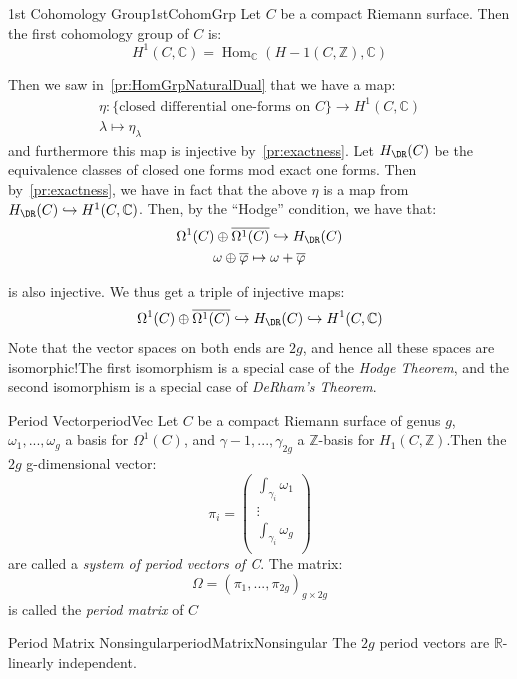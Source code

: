 \documentclass{book}
\newcommand{\C}{{\mathbb{C}}}
\newcommand{\R}{{\mathbb{R}}}
\newcommand{\Z}{{\mathbb{Z}}}
\newcommand{\Hom}{{\operatorname{Hom}}}
\let\temp\phi
\let\phi\varphi
\let\varphi\temp
\begin{document}
\begin{defn}{1st Cohomology Group}{1stCohomGrp}
  Let $C$ be a compact Riemann surface. Then the first cohomology group of $C$ is:
  \[
    H^1(C, \C) = \Hom_\C(H-1(C, \Z), \C)
  \]
\end{defn}
Then we saw in~\cref{pr:HomGrpNaturalDual} that we have a map:
\begin{gather*}
  \eta: \{\text{closed differential one-forms on $C$}\} \to H^1(C, \C) \\
  \lambda \mapsto \eta_\lambda
\end{gather*}
and furthermore this map is injective by~\cref{pr:exactness}. Let $H_\DR(C)$ be the equivalence classes of
closed one forms mod exact one forms. Then by~\cref{pr:exactness}, we have in fact that the above $\eta$ is
a map from $H_\DR(C) \hookrightarrow H^1(C, \C)$. Then, by the ``Hodge'' condition, we have that:
\begin{gather*}
  \Omega^1(C) \oplus \overline{\Omega^1(C)}\hookrightarrow H_\DR(C)\\
  \omega \oplus \overline{\phi} \mapsto \omega + \overline{\phi}
\end{gather*}

is also injective. We thus get a triple of injective maps:
\[
  \Omega^1(C) \oplus \overline{\Omega^1(C)}\hookrightarrow H_\DR(C) \hookrightarrow H^1(C, \C)
\]
Note that the vector spaces on both ends are $2g$, and hence all these spaces are isomorphic!The first
isomorphism is a special case of the \emph{Hodge Theorem}, and the second isomorphism is a special case of
\emph{DeRham's Theorem}.

\begin{defn}{Period Vector}{periodVec}
  Let $C$ be a compact Riemann surface of genus $g$, $\omega_1, ..., \omega_g$ a basis for $\Omega^1(C)$, and
  $\gamma-1, ..., \gamma_{2g}$ a $\Z$-basis for $H_1(C, \Z)$.Then the $2g$ g-dimensional vector:
  \[
    \pi_i = \begin{pmatrix}
      \int_{\gamma_i}\omega_1\\
    \vdots\\
    \int_{\gamma_i}\omega_g\\
    \end{pmatrix}
  \]
  are called a \emph{system of period vectors of C}. The matrix:
  \[
    \Omega = (\pi_1, ..., \pi_{2g})_{g\times 2g}
  \]
  is called the \emph{period matrix} of $C$
\end{defn}

\begin{prop}{Period Matrix Nonsingular}{periodMatrixNonsingular}
  The $2g$ period vectors are $\R$-linearly independent.
\end{prop}
\end{document}
